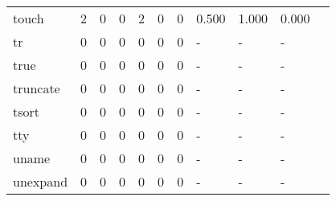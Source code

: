 \begin{longtable}{lp{1.10cm}p{1.10cm}p{1.10cm}p{1.10cm}p{1.10cm}p{1.10cm}p{1.10cm}p{1.10cm}p{1.10cm}p{1.10cm}}
touch     &                      2 &                                  0 &                                 0 &                                2 &                                 0 &                               0 &                          0.500 &                                 1.000 &                               0.000 \\
tr        &                      0 &                                  0 &                                 0 &                                0 &                                 0 &                               0 &                              - &                                     - &                                   - \\
true      &                      0 &                                  0 &                                 0 &                                0 &                                 0 &                               0 &                              - &                                     - &                                   - \\
truncate  &                      0 &                                  0 &                                 0 &                                0 &                                 0 &                               0 &                              - &                                     - &                                   - \\
tsort     &                      0 &                                  0 &                                 0 &                                0 &                                 0 &                               0 &                              - &                                     - &                                   - \\
tty       &                      0 &                                  0 &                                 0 &                                0 &                                 0 &                               0 &                              - &                                     - &                                   - \\
uname     &                      0 &                                  0 &                                 0 &                                0 &                                 0 &                               0 &                              - &                                     - &                                   - \\
unexpand  &                      0 &                                  0 &                                 0 &                                0 &                                 0 &                               0 &                              - &                                     - &                                   - \\

\end{longtable}
